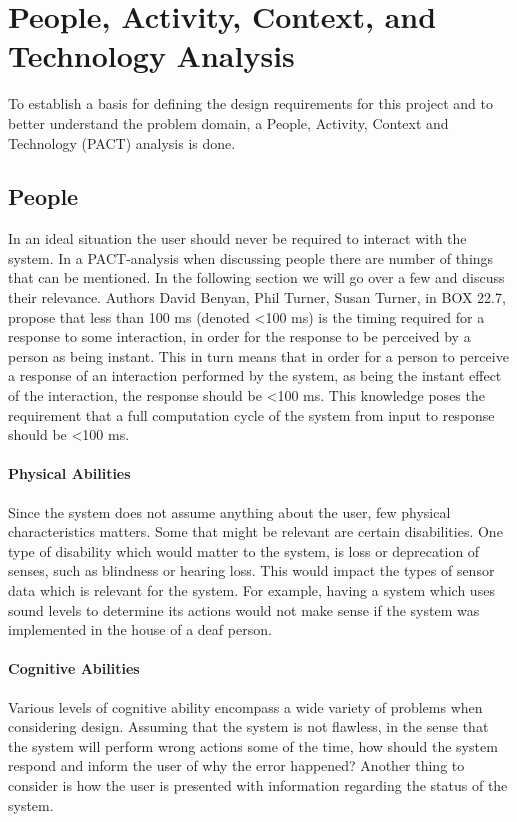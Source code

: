 \section{People, Activity, Context, and Technology Analysis}\label{sec:pact}
To establish a basis for defining the design requirements for this project and
to better understand the problem domain, a People, Activity, Context and Technology (PACT) analysis\cite{DEB} is done.

\subsection{People}\label{sub:people}
In an ideal situation the user should never be required to interact with the system. In a PACT-analysis when discussing people there are number of things that can be mentioned. In the following section we will go over a few and discuss their relevance.
Authors David Benyan, Phil Turner, Susan Turner\cite{DEB}, in BOX 22.7, propose that less than 100 ms (denoted <100 ms) is the timing required for a response to some interaction, in order for the response to be perceived by a person as being instant. This in turn means that in order for a person to perceive a response of an interaction performed by the system, as being the instant effect of the interaction, the response should be <100 ms. This knowledge poses the requirement that a full computation cycle of the system from input to response should be <100 ms.

\paragraph{Physical Abilities}
Since the system does not assume anything about the user, few physical characteristics matters. Some that might be relevant are certain disabilities. One type of disability which would matter to the system, is loss or deprecation of senses, such as blindness or hearing loss. This would impact the types of sensor data which is relevant for the system. For example, having a system which uses sound levels to determine its actions would not make sense if the system was implemented in the house of a deaf person.

\paragraph{Cognitive Abilities}
Various levels of cognitive ability encompass a wide variety of problems
when considering design. Assuming that the system is not flawless, in the
  sense that the system will perform wrong actions some of the time, how should
the system respond and inform the user of why the error happened? Another thing
to consider is how the user is presented with information regarding the status
of the system.

